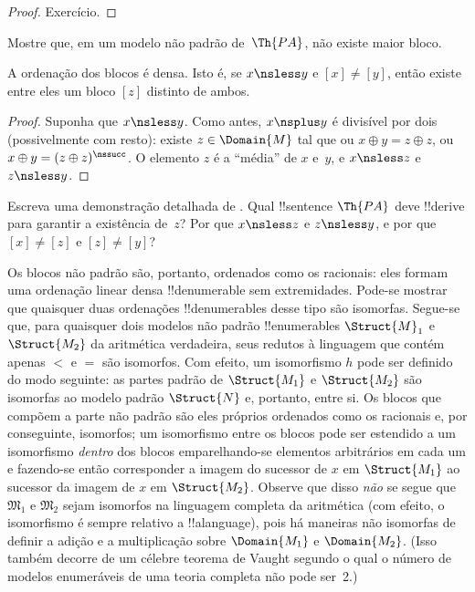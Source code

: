 \documentclass[../../../include/open-logic-section]{subfiles}
\begin{document}
\begin{proof}
Exercício.
\end{proof}

\begin{prob}
Mostre que, em um modelo não padrão de~$\Th{PA}$, não existe maior
bloco.
\end{prob}

\begin{prop}
A ordenação dos blocos é densa. Isto é, se $x \nsless y$ e
$[x] \neq [y]$, então existe entre eles um bloco $[z]$ distinto de
ambos.
\end{prop}

\begin{proof}
Suponha que $x \nsless y$. Como antes, $x \nsplus y$ é divisível por
dois (possivelmente com resto): existe $z \in \Domain{M}$ tal que ou
$x \oplus y = z \oplus z$, ou $x \oplus y = (z \oplus z)^\nssucc$.
O elemento $z$ é a ``média'' de $x$ e~$y$, e $x \nsless z$ e
$z \nsless y$.
\end{proof}

\begin{prob}
Escreva uma demonstração detalhada de
. Qual !!{sentence} $\Th{PA}$
deve !!{derive} para garantir a existência de~$z$? Por que
$x \nsless z$ e $z \nsless y$, e por que $[x] \neq [z]$ e
$[z] \neq [y]$?
\end{prob}

\begin{explain}
Os blocos não padrão são, portanto, ordenados como os racionais: eles
formam uma ordenação linear densa !!{denumerable} sem extremidades. Pode-se mostrar
que quaisquer duas ordenações !!{denumerable}s desse tipo são isomorfas. Segue-se
que, para quaisquer dois modelos não padrão !!{enumerable}s $\Struct{M}_1$ e
$\Struct{M_2}$ da aritmética verdadeira, seus redutos à linguagem que contém
apenas $<$ e $=$ são isomorfos. Com efeito, um isomorfismo $h$ pode ser
definido do modo seguinte: as partes padrão de $\Struct{M_1}$ e
$\Struct{M_2}$ são isomorfas ao modelo padrão $\Struct{N}$ e, portanto, entre
si. Os blocos que compõem a parte não padrão são eles próprios ordenados como
os racionais e, por conseguinte, isomorfos; um isomorfismo entre os blocos
pode ser estendido a um isomorfismo \emph{dentro} dos blocos emparelhando-se
elementos arbitrários em cada um e fazendo-se então corresponder a imagem do
sucessor de $x$ em $\Struct{M_1}$ ao sucessor da imagem de $x$ em
$\Struct{M_2}$. Observe que disso \emph{não} se segue que
$\mathfrak{M}_1$ e $\mathfrak{M}_2$ sejam isomorfos na linguagem completa da
aritmética (com efeito, o isomorfismo é sempre relativo a !!a{language}), pois
há maneiras não isomorfas de definir a adição e a multiplicação sobre
$\Domain{M_1}$ e $\Domain{M_2}$. (Isso também decorre de um célebre teorema
de Vaught segundo o qual o número de modelos enumeráveis de uma teoria
completa não pode ser~2.)
\end{explain}
\end{document}
